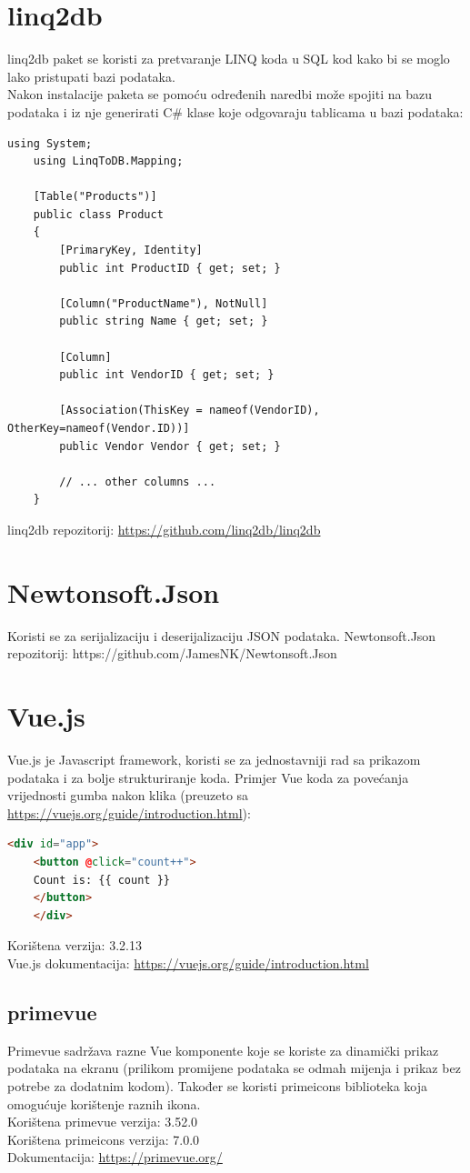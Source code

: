\documentclass[zavrsnirad]{fer}
\begin{document}
\section{linq2db}
\label{pog:linq2db}
linq2db paket se koristi za pretvaranje LINQ koda u SQL kod kako bi se moglo lako pristupati bazi podataka.
\\Nakon instalacije paketa se pomoću određenih naredbi može spojiti na bazu podataka i iz nje generirati C\# klase koje odgovaraju tablicama u bazi podataka:
\begin{lstlisting}[language=CSharp]
	using System;
	using LinqToDB.Mapping;
	
	[Table("Products")]
	public class Product
	{
		[PrimaryKey, Identity]
		public int ProductID { get; set; }
		
		[Column("ProductName"), NotNull]
		public string Name { get; set; }
		
		[Column]
		public int VendorID { get; set; }
		
		[Association(ThisKey = nameof(VendorID), OtherKey=nameof(Vendor.ID))]
		public Vendor Vendor { get; set; }
		
		// ... other columns ...
	}
\end{lstlisting}
linq2db repozitorij: \url{https://github.com/linq2db/linq2db}

\section{Newtonsoft.Json}
Koristi se za serijalizaciju i deserijalizaciju JSON podataka.
Newtonsoft.Json repozitorij: https://github.com/JamesNK/Newtonsoft.Json

\section{Vue.js}
\label{pog:vue}
Vue.js je Javascript framework, koristi se za jednostavniji rad sa prikazom podataka i za bolje strukturiranje koda.
Primjer Vue koda za povećanja vrijednosti gumba nakon klika (preuzeto sa \url{https://vuejs.org/guide/introduction.html}):
\begin{lstlisting}[language=html]
	<div id="app">
	<button @click="count++">
	Count is: {{ count }}
	</button>
	</div>
\end{lstlisting}
Korištena verzija: 3.2.13
\\Vue.js dokumentacija: \url{https://vuejs.org/guide/introduction.html}

\subsection{primevue}
Primevue sadržava razne Vue komponente koje se koriste za dinamički prikaz podataka na ekranu (prilikom promijene podataka se odmah mijenja i prikaz bez potrebe za dodatnim kodom). Također se koristi primeicons biblioteka koja omogućuje korištenje raznih ikona.
\\Korištena primevue verzija: 3.52.0
\\Korištena primeicons verzija: 7.0.0
\\Dokumentacija: \url{https://primevue.org/}
\end{document}

